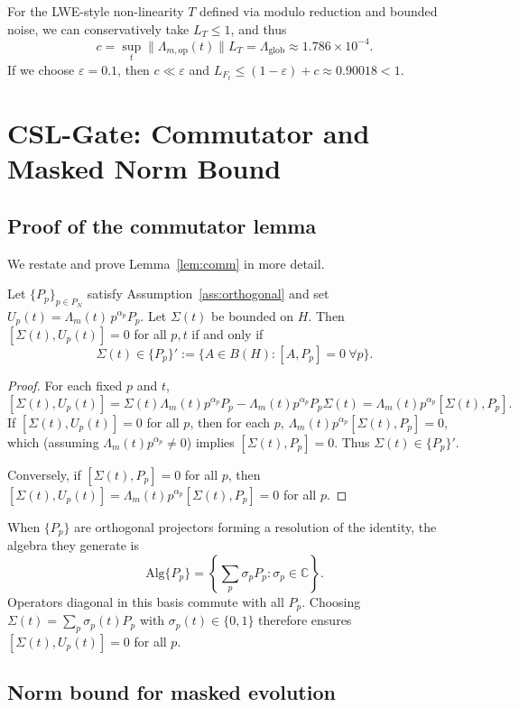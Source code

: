 \documentclass[11pt]{article}
\begin{document}
For the LWE-style non-linearity $T$ defined via modulo reduction and bounded
noise, we can conservatively take $L_T\le 1$, and thus
\[
c = \sup_t \|\Lambda_{m,\mathrm{op}}(t)\| L_T = \Lambda_{\mathrm{glob}} \approx 1.786\times 10^{-4}.
\]
If we choose $\varepsilon = 0.1$, then $c\ll \varepsilon$ and
$L_{F_t} \le (1-\varepsilon)+c \approx 0.90018 < 1$.

\section{CSL-Gate: Commutator and Masked Norm Bound}

\subsection{Proof of the commutator lemma}

We restate and prove Lemma~\ref{lem:comm} in more detail.

\begin{lemma}
Let $\{P_p\}_{p\in P_N}$ satisfy Assumption~\ref{ass:orthogonal} and set
$U_p(t) = \Lambda_m(t)\, p^{\alpha_p} P_p$. Let $\Sigma(t)$ be bounded on $H$.
Then $[\Sigma(t), U_p(t)] = 0$ for all $p,t$ if and only if
\[
\Sigma(t) \in \{P_p\}' := \{A \in B(H): [A, P_p]=0\ \forall p\}.
\]
\end{lemma}

\begin{proof}
For each fixed $p$ and $t$,
\[
[\Sigma(t), U_p(t)]
= \Sigma(t) \Lambda_m(t) p^{\alpha_p} P_p - \Lambda_m(t) p^{\alpha_p} P_p \Sigma(t)
= \Lambda_m(t) p^{\alpha_p} [\Sigma(t), P_p].
\]
If $[\Sigma(t), U_p(t)] = 0$ for all $p$, then for each $p$,
$\Lambda_m(t)p^{\alpha_p}[\Sigma(t),P_p]=0$, which (assuming
$\Lambda_m(t)p^{\alpha_p}\ne 0$) implies $[\Sigma(t),P_p]=0$. Thus
$\Sigma(t)\in\{P_p\}'$.

Conversely, if $[\Sigma(t),P_p]=0$ for all $p$, then
$[\Sigma(t),U_p(t)] = \Lambda_m(t)p^{\alpha_p}[\Sigma(t),P_p]=0$ for all $p$.
\end{proof}

When $\{P_p\}$ are orthogonal projectors forming a resolution of the identity,
the algebra they generate is
\[
\mathrm{Alg}\{P_p\} = \left\{\sum_p \sigma_p P_p: \sigma_p \in \mathbb{C}\right\}.
\]
Operators diagonal in this basis commute with all $P_p$. Choosing
$\Sigma(t) = \sum_p \sigma_p(t) P_p$ with $\sigma_p(t)\in\{0,1\}$ therefore
ensures $[\Sigma(t),U_p(t)]=0$ for all $p$.

\subsection{Norm bound for masked evolution}
\end{document}
